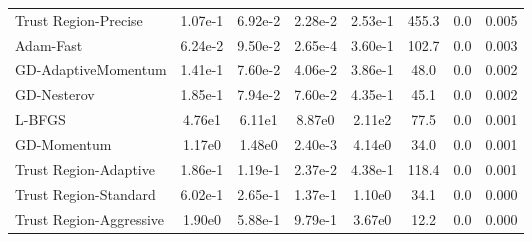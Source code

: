 \documentclass{article}
\begin{document}
\begin{table}[htbp]
{\begin{tabular}{p{2.5cm}*{7}{c}}
Trust Region-Precise & 1.07e-1 & 6.92e-2 & 2.28e-2 & 2.53e-1 & 455.3 & 0.0 & 0.005 \\
Adam-Fast & 6.24e-2 & 9.50e-2 & 2.65e-4 & 3.60e-1 & 102.7 & 0.0 & 0.003 \\
GD-AdaptiveMomentum & 1.41e-1 & 7.60e-2 & 4.06e-2 & 3.86e-1 & 48.0 & 0.0 & 0.002 \\
GD-Nesterov & 1.85e-1 & 7.94e-2 & 7.60e-2 & 4.35e-1 & 45.1 & 0.0 & 0.002 \\
L-BFGS & 4.76e1 & 6.11e1 & 8.87e0 & 2.11e2 & 77.5 & 0.0 & 0.001 \\
GD-Momentum & 1.17e0 & 1.48e0 & 2.40e-3 & 4.14e0 & 34.0 & 0.0 & 0.001 \\
Trust Region-Adaptive & 1.86e-1 & 1.19e-1 & 2.37e-2 & 4.38e-1 & 118.4 & 0.0 & 0.001 \\
Trust Region-Standard & 6.02e-1 & 2.65e-1 & 1.37e-1 & 1.10e0 & 34.1 & 0.0 & 0.000 \\
Trust Region-Aggressive & 1.90e0 & 5.88e-1 & 9.79e-1 & 3.67e0 & 12.2 & 0.0 & 0.000 \\
\bottomrule
\end{tabular}
}
\end{table}
\end{document}
